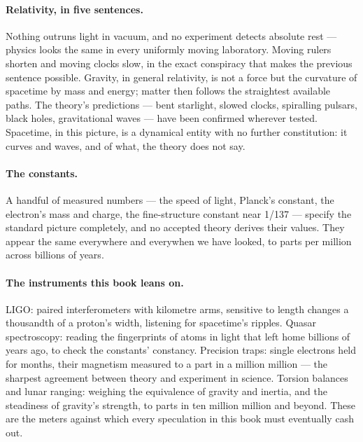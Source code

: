\documentclass[fontsize=11pt,paper=a4,pagesize=auto,parskip=half-]{scrbook}
\newcommand{\Ixtmp}{}
\DeclareRobustCommand{\Ix}[1]{%
  #1%
  \begingroup
    \lowercase{\gdef\Ixtmp{#1}}%
    \expandafter\index\expandafter{\Ixtmp}%
  \endgroup}
\newcommand{\Iy}[1]{#1\index{#1}}
\begin{document}
\paragraph{Relativity, in five sentences.} Nothing outruns light in vacuum, and no experiment detects absolute rest --- physics looks the same in every uniformly moving laboratory. Moving rulers shorten and moving clocks slow, in the exact conspiracy that makes the previous sentence possible. Gravity, in general relativity, is not a force but the curvature of spacetime by mass and energy; matter then follows the straightest available paths. The theory's predictions --- bent starlight, slowed clocks, spiralling pulsars, black holes, gravitational waves --- have been confirmed wherever tested. Spacetime, in this picture, is a dynamical entity with no further constitution: it curves and waves, and of what, the theory does not say.

\paragraph{The constants.} A handful of measured numbers --- the speed of light, Planck's constant, the electron's mass and charge, the fine-structure constant near 1/137 --- specify the standard picture completely, and no accepted theory derives their values. They appear the same everywhere and everywhen we have looked, to parts per million across billions of years.

\paragraph{The instruments this book leans on.} LIGO: paired interferometers with kilometre arms, sensitive to length changes a thousandth of a proton's width, listening for spacetime's ripples. Quasar spectroscopy: reading the fingerprints of atoms in light that left home billions of years ago, to check the constants' constancy. Precision traps: single electrons held for months, their magnetism measured to a part in a million million --- the sharpest agreement between theory and experiment in science. Torsion balances and lunar ranging: weighing the equivalence of gravity and inertia, and the steadiness of gravity's strength, to parts in ten million million and beyond. These are the meters against which every speculation in this book must eventually cash out.

\backmatter
\printbibliography[title={References}]
\end{document}
